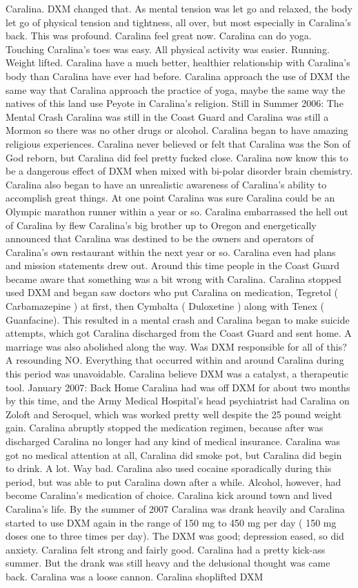\documentclass[12pt]{book}
\begin{document}
Caralina. DXM changed that. As mental tension was let go and relaxed, the body let go of physical tension and tightness, all over, but most especially in Caralina's back. This was profound. Caralina feel great now. Caralina can do yoga. Touching Caralina's toes was easy. All physical activity was easier. Running. Weight lifted. Caralina have a much better, healthier relationship with Caralina's body than Caralina have ever had before. Caralina approach the use of DXM the same way that Caralina approach the practice of yoga, maybe the same way the natives of this land use Peyote in Caralina's religion. Still in Summer 2006: The Mental Crash Caralina was still in the Coast Guard and Caralina was still a Mormon so there was no other drugs or alcohol. Caralina began to have amazing religious experiences. Caralina never believed or felt that Caralina was the Son of God reborn, but Caralina did feel pretty fucked close. Caralina now know this to be a dangerous effect of DXM when mixed with bi-polar disorder brain chemistry. Caralina also began to have an unrealistic awareness of Caralina's ability to accomplish great things. At one point Caralina was sure Caralina could be an Olympic marathon runner within a year or so. Caralina embarrassed the hell out of Caralina by flew Caralina's big brother up to Oregon and energetically announced that Caralina was destined to be the owners and operators of Caralina's own restaurant within the next year or so. Caralina even had plans and mission statements drew out. Around this time people in the Coast Guard became aware that something was a bit wrong with Caralina. Caralina stopped used DXM and began saw doctors who put Caralina on medication, Tegretol ( Carbamazepine ) at first, then Cymbalta ( Duloxetine ) along with Tenex ( Guanfacine). This resulted in a mental crash and Caralina began to make suicide attempts, which got Caralina discharged from the Coast Guard and sent home. A marriage was also abolished along the way. Was DXM responsible for all of this? A resounding NO. Everything that occurred within and around Caralina during this period was unavoidable. Caralina believe DXM was a catalyst, a therapeutic tool. January 2007: Back Home Caralina had was off DXM for about two months by this time, and the Army Medical Hospital's head psychiatrist had Caralina on Zoloft and Seroquel, which was worked pretty well despite the 25 pound weight gain. Caralina abruptly stopped the medication regimen, because after was discharged Caralina no longer had any kind of medical insurance. Caralina was got no medical attention at all, Caralina did smoke pot, but Caralina did begin to drink. A lot. Way bad. Caralina also used cocaine sporadically during this period, but was able to put Caralina down after a while. Alcohol, however, had become Caralina's medication of choice. Caralina kick around town and lived Caralina's life. By the summer of 2007 Caralina was drank heavily and Caralina started to use DXM again in the range of 150 mg to 450 mg per day ( 150 mg doses one to three times per day). The DXM was good; depression eased, so did anxiety. Caralina felt strong and fairly good. Caralina had a pretty kick-ass summer. But the drank was still heavy and the delusional thought was came back. Caralina was a loose cannon. Caralina shoplifted DXM 
\end{document}
